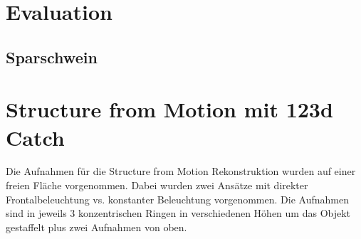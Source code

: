 \documentclass[]{article}
\begin{document}
\section{Evaluation}
\subsection{}
\subsection{}
\subsection{Sparschwein}


\section{Structure from Motion mit 123d Catch} %

Die Aufnahmen für die Structure from Motion Rekonstruktion wurden auf einer freien Fläche vorgenommen. Dabei wurden zwei Ansätze mit direkter Frontalbeleuchtung vs. konstanter Beleuchtung vorgenommen.
Die Aufnahmen sind in jeweils 3 konzentrischen Ringen in verschiedenen Höhen um das Objekt gestaffelt plus zwei Aufnahmen von oben.

\subsection{}
\subsection{}
\subsection{}

		
\end{document}
